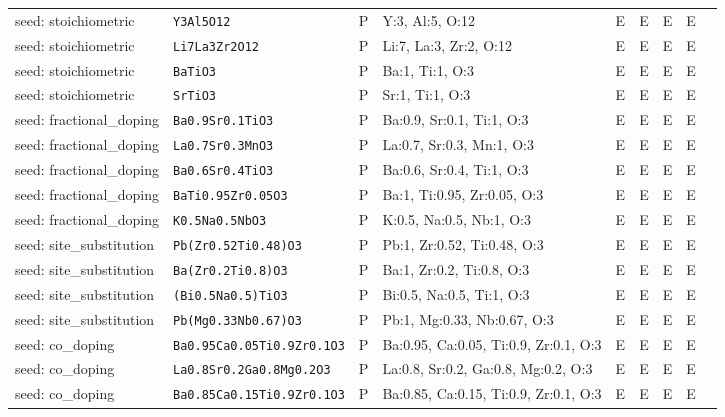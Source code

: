 \begin{longtable}{@{}>{\raggedright\arraybackslash}p{2.5cm}lcp{2.9cm}cccc>{\raggedright\arraybackslash}p{2.7cm}@{}}
seed: stoichiometric & \texttt{Y3Al5O12} & P & Y:3, Al:5, O:12 & E & E & E & E & {\scriptsize\texttt{}} \\
seed: stoichiometric & \texttt{Li7La3Zr2O12} & P & Li:7, La:3, Zr:2, O:12 & E & E & E & E & {\scriptsize\texttt{}} \\
seed: stoichiometric & \texttt{BaTiO3} & P & Ba:1, Ti:1, O:3 & E & E & E & E & {\scriptsize\texttt{}} \\
seed: stoichiometric & \texttt{SrTiO3} & P & Sr:1, Ti:1, O:3 & E & E & E & E & {\scriptsize\texttt{}} \\
seed: fractional\_doping & \texttt{Ba0.9Sr0.1TiO3} & P & Ba:0.9, Sr:0.1, Ti:1, O:3 & E & E & E & E & {\scriptsize\texttt{}} \\
seed: fractional\_doping & \texttt{La0.7Sr0.3MnO3} & P & La:0.7, Sr:0.3, Mn:1, O:3 & E & E & E & E & {\scriptsize\texttt{}} \\
seed: fractional\_doping & \texttt{Ba0.6Sr0.4TiO3} & P & Ba:0.6, Sr:0.4, Ti:1, O:3 & E & E & E & E & {\scriptsize\texttt{}} \\
seed: fractional\_doping & \texttt{BaTi0.95Zr0.05O3} & P & Ba:1, Ti:0.95, Zr:0.05, O:3 & E & E & E & E & {\scriptsize\texttt{}} \\
seed: fractional\_doping & \texttt{K0.5Na0.5NbO3} & P & K:0.5, Na:0.5, Nb:1, O:3 & E & E & E & E & {\scriptsize\texttt{}} \\
seed: site\_substitution & \texttt{Pb(Zr0.52Ti0.48)O3} & P & Pb:1, Zr:0.52, Ti:0.48, O:3 & E & E & E & E & {\scriptsize\texttt{}} \\
seed: site\_substitution & \texttt{Ba(Zr0.2Ti0.8)O3} & P & Ba:1, Zr:0.2, Ti:0.8, O:3 & E & E & E & E & {\scriptsize\texttt{}} \\
seed: site\_substitution & \texttt{(Bi0.5Na0.5)TiO3} & P & Bi:0.5, Na:0.5, Ti:1, O:3 & E & E & E & E & {\scriptsize\texttt{}} \\
seed: site\_substitution & \texttt{Pb(Mg0.33Nb0.67)O3} & P & Pb:1, Mg:0.33, Nb:0.67, O:3 & E & E & E & E & {\scriptsize\texttt{}} \\
seed: co\_doping & \texttt{Ba0.95Ca0.05Ti0.9Zr0.1O3} & P & Ba:0.95, Ca:0.05, Ti:0.9, Zr:0.1, O:3 & E & E & E & E & {\scriptsize\texttt{}} \\
seed: co\_doping & \texttt{La0.8Sr0.2Ga0.8Mg0.2O3} & P & La:0.8, Sr:0.2, Ga:0.8, Mg:0.2, O:3 & E & E & E & E & {\scriptsize\texttt{}} \\
seed: co\_doping & \texttt{Ba0.85Ca0.15Ti0.9Zr0.1O3} & P & Ba:0.85, Ca:0.15, Ti:0.9, Zr:0.1, O:3 & E & E & E & E & {\scriptsize\texttt{}} \\

\end{longtable}
